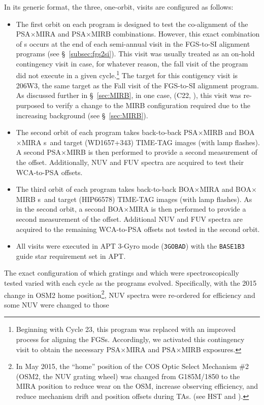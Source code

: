 In its generic format, the three, one-orbit, visits are configured as follows:
\begin{itemize}
	\item{The first orbit on each program is designed to test the co-alignment of the PSA$\times$MIRA and PSA$\times$MIRB  combinations.
However, this exact combination of s occurs at the end of each semi-annual visit in the FGS-to-SI alignment programs (see \S~\ref{subsec:fgs2si}).
This visit was usually treated as an on-hold contingency visit in case, for whatever reason, the fall visit of the program did not execute in a given cycle.\footnote{Beginning with Cycle 23, this program
was replaced with an improved process for aligning the FGSs. Accordingly,  we activated this contingency visit to obtain the necessary PSA$\times$MIRA and PSA$\times$MIRB exposures.}
The target for this contigency visit is 206W3, the same target as the Fall visit of the FGS-to-SI alignment program.
As discussed further in \S~\ref{sec:MIRB}, in one case, (C22, ), this visit was re-purposed to verify a change to the MIRB configuration required due to the increasing background (see \S~\ref{sec:MIRB}).}
	\item{The second orbit of each program takes back-to-back PSA$\times$MIRB and BOA$\times$MIRA s~and target (WD1657+343) TIME-TAG images (with lamp flashes).
	A second PSA$\times$MIRB  is then performed to provide a second measurement of the offset.
	Additionally, NUV and FUV spectra are acquired to test their WCA-to-PSA offsets.}
	\item{The third orbit of each program takes back-to-back BOA$\times$MIRA and BOA$\times$MIRB s~and target (HIP66578) TIME-TAG images (with lamp flashes).
	As in the second orbit, a second BOA$\times$MIRA  is then performed to provide a second measurement of the offset.
	Additional NUV and FUV spectra are acquired to the remaining WCA-to-PSA offsets not tested in the second orbit.}
	\item{All visits were executed in APT 3-Gyro mode (\texttt{3GOBAD}) with the \texttt{BASE1B3} guide star requirement set in APT.}
\end{itemize}
The exact configuration of which gratings and which \cenwaves were spectroscopically tested varied with each cycle as the programs evolved.
Specifically, with the 2015 change in OSM2 home position\footnote{In May 2015, the ``home'' position of the COS Optic Select Mechanism \#2 (OSM2, the NUV grating wheel) was changed from G185M/1850 to the MIRA position to reduce wear on the OSM, increase observing efficiency, and reduce mechanism drift and position offsets during  TAs. (see HST  and ).}, NUV spectra were re-ordered for efficiency and some NUV \cenwaves were changed to those
